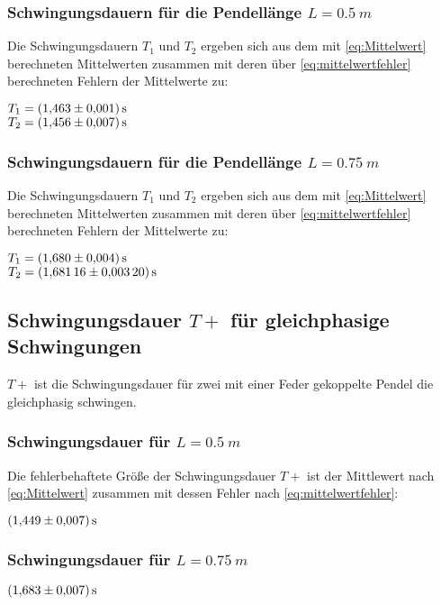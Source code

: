 \subsubsection{Schwingungsdauern für die Pendellänge $L=\SI{0,5}{m}$}
Die Schwingungsdauern $T_1$ und $T_2$ ergeben sich aus dem mit \autoref{eq:Mittelwert} berechneten Mittelwerten
zusammen mit deren über \autoref{eq:mittelwertfehler} berechneten Fehlern der Mittelwerte zu:
\begin{center}
  $T_1=\SI{1.463\pm0.001}{s}$\\
  $T_2=\SI{1.456\pm0.007}{s}$
\end{center}


\subsubsection{Schwingungsdauern für die Pendellänge $L=\SI{0,75}{m}$}
Die Schwingungsdauern $T_1$ und $T_2$ ergeben sich aus dem mit \autoref{eq:Mittelwert} berechneten Mittelwerten
zusammen mit deren über \autoref{eq:mittelwertfehler} berechneten Fehlern der Mittelwerte zu:
\begin{center}
  $T_1=\SI{1.680\pm0.004}{s}$\\
  $T_2=\SI{1.68116\pm0.0032}{s}$
\end{center}


\subsection{Schwingungsdauer $T+$  für gleichphasige Schwingungen}
$T+$ ist die Schwingungsdauer für zwei mit einer Feder gekoppelte Pendel die gleichphasig schwingen.
\subsubsection{Schwingungsdauer für $L=\SI{0,5}{m}$}
\label{sec:T+50}
Die fehlerbehaftete Größe der Schwingungsdauer $T+$ ist der Mittlewert nach \autoref{eq:Mittelwert} zusammen 
mit dessen Fehler nach \autoref{eq:mittelwertfehler}:
\begin{center}
  
  $\SI{1.449\pm0.007}{s}$
\end{center}
\subsubsection{Schwingungsdauer für $L=\SI{0,75}{m}$}
\label{sec:T+75}
\begin{center}
 $\SI{1.683\pm0.007}{s}$ 
\end{center}

